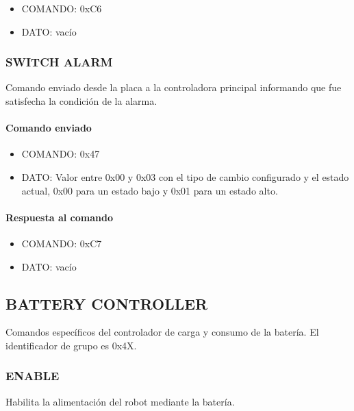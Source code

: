 \begin{itemize}
	\item{COMANDO:} 0xC6
	\item{DATO:} vac\'io
\end{itemize}

\subsubsection{SWITCH ALARM}
\label{hA_protocolo_switch_alarm_ds}

Comando enviado desde la placa a la controladora principal informando que fue satisfecha la condici\'on de la alarma.

\paragraph*{Comando enviado}

\begin{itemize}
	\item{COMANDO:} 0x47
	\item{DATO:} Valor entre 0x00 y 0x03 con el tipo de cambio configurado y el estado actual, 0x00 para un estado bajo y 
	0x01 para un estado alto.
\end{itemize}

\paragraph*{Respuesta al comando}

\begin{itemize}
	\item{COMANDO:} 0xC7
	\item{DATO:} vac\'io
\end{itemize}

\subsection{BATTERY CONTROLLER} 
\label{hA_protocolo_grupo_battery_controller}

Comandos espec\'ificos del controlador de carga y consumo de la bater\'ia.
El identificador de grupo es 0x4X.

\subsubsection{ENABLE}
\label{hA_protocolo_get_battery_value}

Habilita la alimentaci\'on del robot mediante la bater\'ia.

